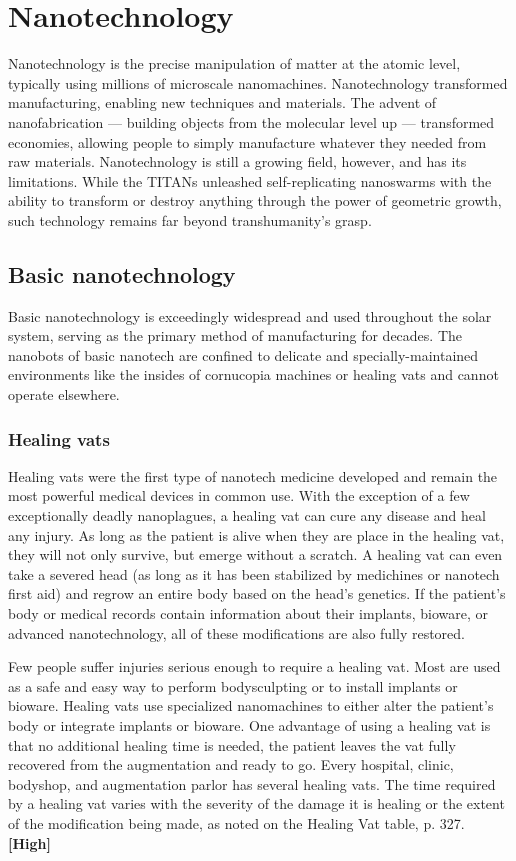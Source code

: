 \section{Nanotechnology}
\label{sec:nanotech}

Nanotechnology is the precise manipulation of matter at the atomic level, typically using millions of microscale nanomachines. Nanotechnology transformed manufacturing, enabling new techniques and materials. The advent of nanofabrication --- building objects from the molecular level up --- transformed economies, allowing people to simply manufacture whatever they needed from raw materials. Nanotechnology is still a growing field, however, and has its limitations. While the TITANs unleashed self-replicating nanoswarms with the ability to transform or destroy anything through the power of geometric growth, such technology remains far beyond transhumanity’s grasp.


\subsection{Basic nanotechnology}
\label{sec:basic-nanotech}

Basic nanotechnology is exceedingly widespread and used throughout the solar system, serving as the primary method of manufacturing for decades. The nanobots of basic nanotech are confined to delicate and specially-maintained environments like the insides of cornucopia machines or healing vats and cannot operate elsewhere.

\subsubsection{Healing vats}

Healing vats were the first type of nanotech medicine developed and remain the most powerful medical devices in common use. With the exception of a few exceptionally deadly nanoplagues, a healing vat can cure any disease and heal any injury. As long as the patient is alive when they are place in the healing vat, they will not only survive, but emerge without a scratch. A healing vat can even take a severed head (as long as it has been stabilized by medichines or nanotech first aid) and regrow an entire body based on the head’s genetics. If the patient’s body or medical records contain information about their implants, bioware, or advanced nanotechnology, all of these modifications are also fully restored.

Few people suffer injuries serious enough to require a healing vat. Most are used as a safe and easy way to perform bodysculpting or to install implants or bioware. Healing vats use specialized nanomachines to either alter the patient’s body or integrate implants or bioware. One advantage of using a healing vat is that no additional healing time is needed, the patient leaves the vat fully recovered from the augmentation and ready to go. Every hospital, clinic, bodyshop, and augmentation parlor has several healing vats. The time required by a healing vat varies with the severity of the damage it is healing or the extent of the modification being made, as noted on the Healing Vat table, p. 327. \textbf{[High]}

